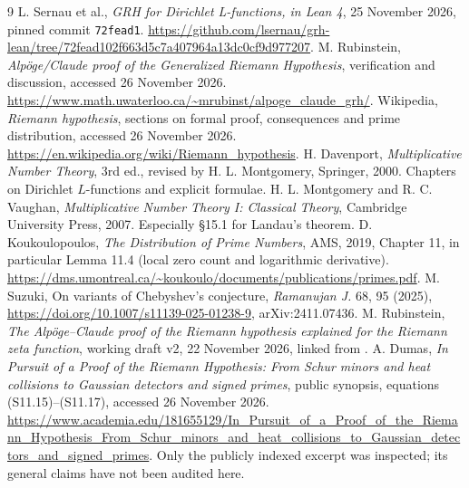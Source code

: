 \documentclass[11pt]{article}
\theoremstyle{remark}\newtheorem{remark}[theorem]{Remark}
\begin{document}
\begin{thebibliography}{9}\small
{} L. Sernau et al., \emph{GRH for Dirichlet L-functions, in Lean 4}, 25 November 2026, pinned commit \texttt{72fead1}. \url{https://github.com/lsernau/grh-lean/tree/72fead102f663d5c7a407964a13dc0cf9d977207}.
 M. Rubinstein, \emph{Alp\"oge/Claude proof of the Generalized Riemann Hypothesis}, verification and discussion, accessed 26 November 2026. \url{https://www.math.uwaterloo.ca/~mrubinst/alpoge_claude_grh/}.
 Wikipedia, \emph{Riemann hypothesis}, sections on formal proof, consequences and prime distribution, accessed 26 November 2026. \url{https://en.wikipedia.org/wiki/Riemann_hypothesis}.
 H. Davenport, \emph{Multiplicative Number Theory}, 3rd ed., revised by H. L. Montgomery, Springer, 2000. Chapters on Dirichlet $L$-functions and explicit formulae.
 H. L. Montgomery and R. C. Vaughan, \emph{Multiplicative Number Theory I: Classical Theory}, Cambridge University Press, 2007. Especially \S15.1 for Landau's theorem.
 D. Koukoulopoulos, \emph{The Distribution of Prime Numbers}, AMS, 2019, Chapter 11, in particular Lemma 11.4 (local zero count and logarithmic derivative). \url{https://dms.umontreal.ca/~koukoulo/documents/publications/primes.pdf}.
 M. Suzuki, On variants of Chebyshev's conjecture, \emph{Ramanujan J.} 68, 95 (2025), \url{https://doi.org/10.1007/s11139-025-01238-9}, arXiv:2411.07436.
 M. Rubinstein, \emph{The Alp\"oge--Claude proof of the Riemann hypothesis explained for the Riemann zeta function}, working draft v2, 22 November 2026, linked from \cite{rubinstein}.
 A. Dumas, \emph{In Pursuit of a Proof of the Riemann Hypothesis: From Schur minors and heat collisions to Gaussian detectors and signed primes}, public synopsis, equations (S11.15)--(S11.17), accessed 26 November 2026. \url{https://www.academia.edu/181655129/In_Pursuit_of_a_Proof_of_the_Riemann_Hypothesis_From_Schur_minors_and_heat_collisions_to_Gaussian_detectors_and_signed_primes}. Only the publicly indexed excerpt was inspected; its general claims have not been audited here.
\end{thebibliography}
\end{document}
